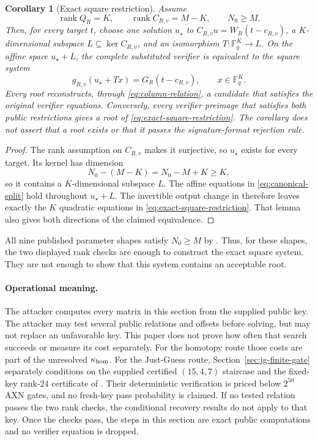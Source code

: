 \documentclass[11pt]{article}
\newtheorem{corollary}[theorem]{Corollary}
\newcommand{\F}{\mathbb F}
\newcommand{\rank}{\operatorname{rank}}
\begin{document}
\begin{corollary}[Exact square restriction]
\label{cor:exact-square-restriction}
Assume
\[
  \rank Q_R=K,
  \qquad
  \rank C_{R,v}=M-K,
  \qquad
  N_0\ge M.
\]
Then, for every target $t$, choose one solution $u_\star$ to
$C_{R,v}u=W_R(t-c_{R,v})$, a $K$-dimensional subspace
$L\subseteq\ker C_{R,v}$, and an isomorphism
$T:\F_q^K\to L$.  On the affine space $u_\star+L$, the complete substituted
verifier is equivalent to the square system
\begin{equation}
  g_{R,v}(u_\star+Tx)=G_R(t-c_{R,v}),
  \qquad x\in\F_q^K.                               \label{eq:exact-square-restriction}
\end{equation}
Every root reconstructs, through \eqref{eq:column-relation}, a candidate that
satisfies the original verifier equations.  Conversely, every verifier
preimage that satisfies both public restrictions gives a root of
\eqref{eq:exact-square-restriction}.  The corollary does not assert that a root
exists or that it passes the signature-format rejection rule.
\end{corollary}

\begin{proof}
The rank assumption on $C_{R,v}$ makes it surjective, so $u_\star$ exists for
every target.  Its kernel has dimension
\[
  N_0-(M-K)=N_0-M+K\ge K,
\]
so it contains a $K$-dimensional subspace $L$.  The affine equations in
\eqref{eq:canonical-split} hold throughout $u_\star+L$.  The invertible output
change in  therefore leaves exactly the $K$
quadratic equations in \eqref{eq:exact-square-restriction}.  That lemma also
gives both directions of the claimed equivalence.
\end{proof}

All nine published parameter shapes satisfy $N_0\ge M$ by
.  Thus, for these shapes, the two displayed rank checks
are enough to construct the exact square system.  They are not enough to show
that this system contains an acceptable root.

\paragraph{Operational meaning.}
The attacker computes every matrix in this section from the supplied public
key.  The attacker may test several public relations and offsets before
solving, but may not replace an unfavorable key.  This paper does not prove
how often that search succeeds or measure its cost separately.  For the
homotopy route those costs are part of the unresolved $\kappa_{\rm hom}$.
For the Just-Guess route, Section~\ref{sec:jg-finite-gate} separately
conditions on the supplied certified $(15,4,7)$ staircase and the fixed-key
rank-$24$ certificate of .  Their deterministic
verification is priced below $2^{50}$ AXN gates, and no fresh-key pass
probability is claimed.  If no tested relation passes the two rank checks, the
conditional recovery results do not apply to that key.  Once the checks pass,
the steps in this section are exact public computations and no verifier
equation is dropped.
\end{document}
